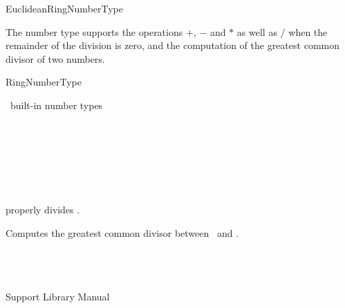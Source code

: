 \begin{ccRefConcept}{EuclideanRingNumberType}

The number type supports the operations $+$, $-$ and $*$ as well as
$/$ when the remainder of the division is zero, and the computation of
the greatest common divisor of two numbers.

\ccRefines
RingNumberType

\ccHasModels
\CC\ built-in number types \\
 \\
 \\
 \\
 \\
 \\
 \\


\ccOperations
\ccGlue
{}
       {\ccPrecond {} properly divides \ccVar.}

\ccGlue
{}
       {Computes the greatest common divisor between \ccVar\ and .}


\ccSeeAlso
{} \\
 \\
\\
Support Library Manual

\end{ccRefConcept}
